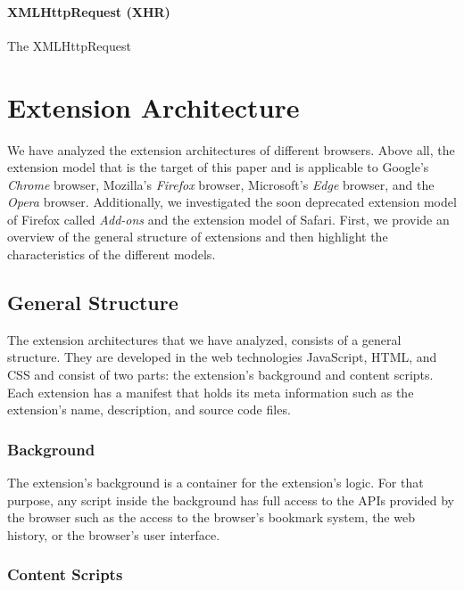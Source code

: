 {\paragraph{XMLHttpRequest (XHR)}

	The XMLHttpRequest 



\newpage
\section{Extension Architecture}
	
	We have analyzed the extension architectures of different browsers. Above all, the extension model that is the target of this paper and is applicable to Google's \textit{Chrome} browser, Mozilla's \textit{Firefox} browser, Microsoft's \textit{Edge} browser, and the \textit{Opera} browser. Additionally, we investigated the soon deprecated extension model of Firefox called \textit{Add-ons} and the extension model of Safari. First, we provide an overview of the general structure of extensions and then highlight the characteristics of the different models.
	
\subsection{General Structure} %

	The extension architectures that we have analyzed, consists of a general structure. They are developed in the web technologies JavaScript, HTML, and CSS and consist of two parts: the extension's background and content scripts. Each extension has a manifest that holds its meta information such as the extension's name, description, and source code files.
	
\subsubsection{Background}

	The extension's background is a container for the extension's logic. For that purpose, any script inside the background has full access to the APIs provided by the browser such as the access to the browser's bookmark system, the web history, or the browser's user interface. 
	
\subsubsection{Content Scripts}

}
